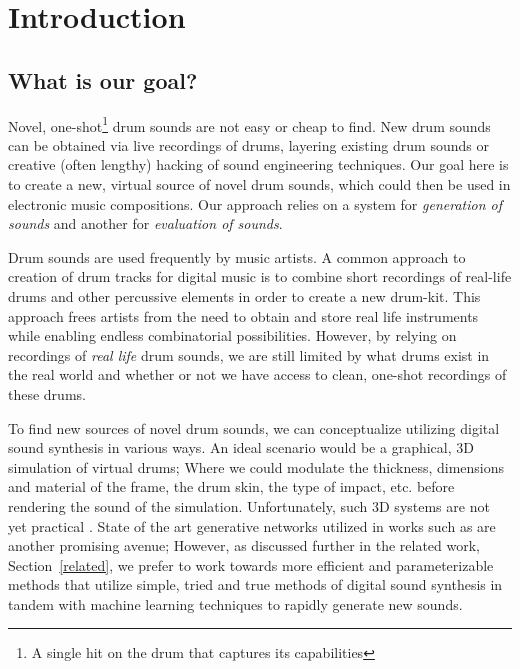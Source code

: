 \documentclass[\main/thesis.tex]{subfiles}
\begin{document}
\chapter{Introduction}


\section{What is our goal?}
Novel, one-shot\footnote{A single hit on the drum that captures its capabilities} drum sounds are not easy or cheap to find. New drum sounds can be obtained via live recordings of drums, layering existing drum sounds or creative (often lengthy) hacking of sound engineering techniques. Our goal here is to create a new, virtual source of novel drum sounds, which could then be used in electronic music compositions. Our approach relies on a system for \textit{generation of sounds} and another for \textit{evaluation of sounds}. 

 Drum sounds are used frequently by music artists. A common approach to creation of drum tracks for digital music is to combine short recordings of real-life drums and other percussive elements in order to create a new drum-kit. This approach frees artists from the need to obtain and store real life instruments while enabling endless combinatorial possibilities. However, by relying on recordings of \textit{real life} drum sounds, we are still limited by what drums exist in the real world and whether or not we have access to clean, one-shot recordings of these drums.

To find new sources of novel drum sounds, we can conceptualize utilizing digital sound synthesis in various ways. An ideal scenario would be a graphical, 3D simulation of virtual drums; 
Where we could modulate the thickness, dimensions and material of the frame, the drum skin, the type of impact, etc. before rendering the sound of the simulation. Unfortunately, such 3D systems are not yet practical \cite{langlois2016toward}. State of the art generative networks utilized in works such as \cite{ramires2019timbfeat,aouameur2019neural} 
are another promising avenue; However, as discussed further in the related work, Section~\ref{related}, we prefer to work towards more efficient and parameterizable methods that utilize simple, tried and true methods of digital sound synthesis in tandem with machine learning techniques to rapidly generate new sounds.
\end{document}
